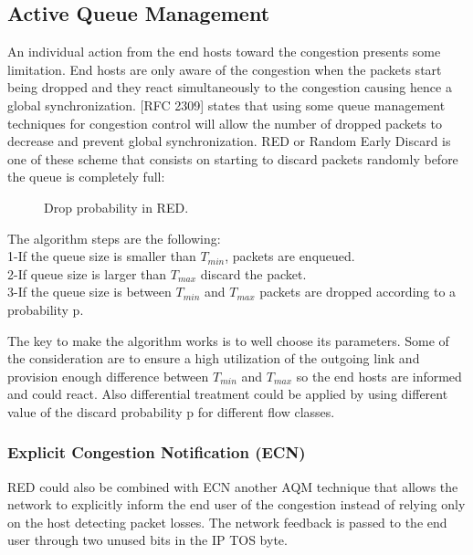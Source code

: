 \subsection{Active Queue Management}

An individual action from the end hosts toward the congestion presents some limitation. End hosts are only aware of the congestion when the packets start being dropped and they react simultaneously to the congestion causing hence a global synchronization. [RFC 2309] states that using some queue management techniques for congestion control will allow the number of dropped packets to decrease and prevent global synchronization. 
RED or Random Early Discard is one of these scheme that consists on starting to discard packets randomly before the queue is completely full:

 \begin{figure}[h]
  \begin{center}
\caption{
  Drop probability in RED.
    \label{fig:RED}
}
 \end{center}
\end{figure}

The algorithm steps are the following:\\
1-If the queue size is smaller than $T_{min}$, packets are enqueued.\\
2-If queue size is larger than $T_{max}$ discard the packet.\\
3-If the queue size is between $T_{min}$ and $T_{max}$ packets are dropped according to a probability p.

The key to make the algorithm works is to well choose its parameters. Some of the consideration are to ensure a high utilization of the outgoing link and provision enough difference between $T_{min}$ and $T_{max}$ so the end hosts are informed and could react. Also differential treatment could be applied by using different value of the discard probability p for different flow classes. 

\subsubsection{Explicit Congestion Notification (ECN)}
RED could also be combined with ECN \cite{RFC2481} another AQM technique that allows the network to explicitly inform the end user of the congestion instead of relying only on the host detecting packet losses. The network feedback is passed to the end user through two unused bits in the IP TOS byte.


